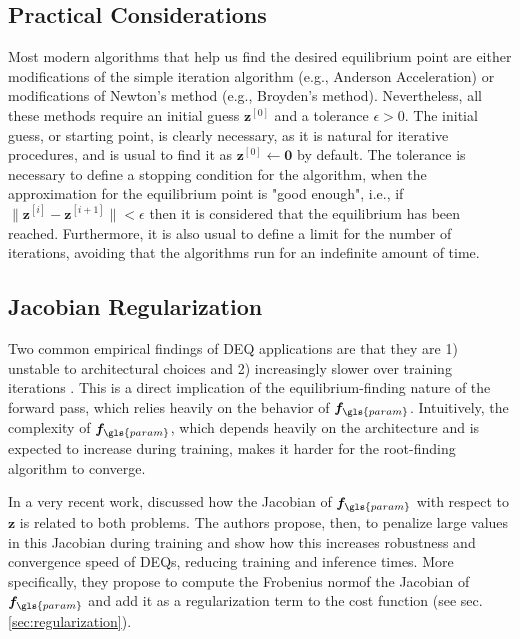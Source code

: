 \subsection{Practical Considerations}

Most modern algorithms that help us find the desired equilibrium point are either modifications of the simple iteration algorithm (e.g., Anderson Acceleration\cite{walker_anderson_2011}) or modifications of Newton's method (e.g., Broyden's method\cite{broyden_class_1965}).
Nevertheless, all these methods require an initial guess $\bm{z}^{[0]}$ and a tolerance $\epsilon>0$. 
The initial guess, or starting point, is clearly necessary, as it is natural for iterative procedures, and is usual to find it as $\bm{z}^{[0]}\gets \bm{0}$ by default.
The tolerance is necessary to define a stopping condition for the algorithm, when the approximation for the equilibrium point is "good enough", i.e., if $\|\bm{z}^{[i]}-\bm{z}^{[i+1]}\|<\epsilon$ then it is considered that the equilibrium has been reached.
Furthermore, it is also usual to define a limit for the number of iterations, avoiding that the algorithms run for an indefinite amount of time.

\subsection{Jacobian Regularization}\label{sec:deq-jac-reg}

Two common empirical findings of \gls{DEQ} applications are that they are 1) unstable to architectural choices \cite{bai_stabilizing_2021} and 2) increasingly slower over training iterations \cite{Bai2019,winston_monotone_2020}.
This is a direct implication of the equilibrium-finding nature of the forward pass, which relies heavily on the behavior of $\bm{f}_{\gls{param}}$.
Intuitively, the complexity of $\bm{f}_{\gls{param}}$, which depends heavily on the architecture and is expected to increase during training, makes it harder for the root-finding algorithm to converge.

In a very recent work, \textcite{bai_stabilizing_2021} discussed how the Jacobian of $\bm{f}_{\gls{param}}$ with respect to $\bm{z}$ is related to both problems.
The authors propose, then, to penalize large values in this Jacobian during training and show how this increases robustness and convergence speed of \gls{DEQ}s, reducing training and inference times.
More specifically, they propose to compute the Frobenius norm\footnotemark of the Jacobian of $\bm{f}_{\gls{param}}$ and add it as a regularization term to the cost function (see sec. \ref{sec:regularization}).

